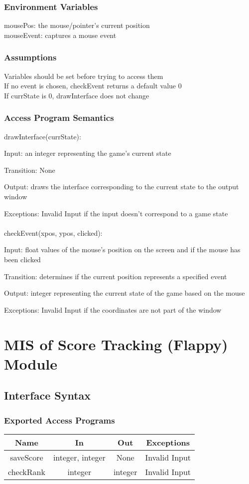 \documentclass[12pt, titlepage]{article}
\begin{document}
		\subsubsection{Environment Variables}
		mousePos: the mouse/pointer's current position\\
		mouseEvent: captures a mouse event 
		\subsubsection{Assumptions}
		Variables should be set before trying to access them \\ 
		If no event is chosen, checkEvent returns a default value 0 \\
		If currState is 0, drawInterface does not change \\
		
		\subsubsection{Access Program Semantics}
		drawInterface(currState):
		
		Input: an integer representing the game's current state
		
		Transition: None
		
		Output: draws the interface corresponding to the current state to the output window
		
		Exceptions: Invalid Input if the input doesn't correspond to a game state\\
		\\
		checkEvent(xpos, ypos, clicked):
		
		Input: float values of the mouse's position on the screen and if the mouse has been clicked
		
		Transition: determines if the current position represents a specified event
		
		Output: integer representing the current state of the game based on the mouse
		
		Exceptions: Invalid Input if the coordinates are not part of the window


\section{MIS of Score Tracking (Flappy) Module}
		\subsection{Interface Syntax}
		\subsubsection{Exported Access Programs}
		\begin{tabular}[pos]{|c|c|c|c|}
			\hline
			\textbf{Name}& \textbf{In} & \textbf{Out} & \textbf{Exceptions} \\ \hline
			saveScore & integer, integer & None & Invalid Input \\ \hline
			checkRank & integer & integer & Invalid Input \\ \hline
		\end{tabular}
		
\end{document}
